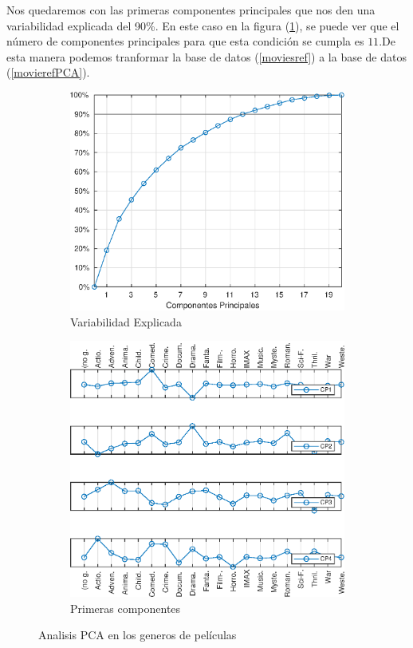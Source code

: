 Nos quedaremos con las primeras componentes principales que nos den una variabilidad explicada del 90\%. En este caso en la figura (\ref{VarExp}), se puede ver que el número de componentes principales para que esta condición se cumpla es $11$.De esta manera podemos tranformar la base de datos (\ref{moviesref}) a la base de datos (\ref{movierefPCA}).

\begin{figure}[ht!]
    \centering
    \begin{subfigure}[b]{0.4\textwidth}
        \includegraphics[scale=0.6]{img/varexp.eps}
        \caption{Variabilidad Explicada}\label{VarExp}
    \end{subfigure}
    \hspace{2cm}
    \begin{subfigure}[b]{0.4\textwidth}
        \includegraphics[scale=0.625]{img/firstPCA.eps}
        \caption{Primeras componentes}
    \end{subfigure}
    \caption{Analisis PCA en los generos de películas}
    \label{}
\end{figure}

